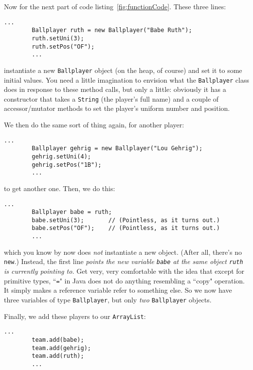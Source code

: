 Now for the next part of code listing~\ref{fig:functionCode}. These three
lines:

\begin{Verbatim}[fontsize=\small,samepage=true,frame=single]
        ...
        Ballplayer ruth = new Ballplayer("Babe Ruth");
        ruth.setUni(3);
        ruth.setPos("OF");
        ...
\end{Verbatim}

instantiate a new \texttt{Ballplayer} object (on the heap, of course) and set
it to some initial values. You need a little imagination to envision what the
\texttt{Ballplayer} class does in response to these method calls, but only a
little: obviously it has a constructor that takes a \texttt{String} (the
player's full name) and a couple of accessor/mutator methods to set the
player's uniform number and position. 

\pagebreak
We then do the same sort of thing again, for another player:

\begin{Verbatim}[fontsize=\small,samepage=true,frame=single]
        ...
        Ballplayer gehrig = new Ballplayer("Lou Gehrig");
        gehrig.setUni(4);
        gehrig.setPos("1B");
        ...
\end{Verbatim}

to get another one. Then, we do this:

\begin{Verbatim}[fontsize=\small,samepage=true,frame=single]
        ...
        Ballplayer babe = ruth;
        babe.setUni(3);       // (Pointless, as it turns out.)
        babe.setPos("OF");    // (Pointless, as it turns out.)
        ...
\end{Verbatim}

which you know by now does \textit{not} instantiate a new object. (After all,
there's no \texttt{new}.) Instead, the first line \textit{points the new
variable \texttt{babe} at the same object \texttt{ruth} is currently pointing
to.} Get very, very comfortable with the idea that except for primitive types,
``\texttt{=}" in Java does not do anything resembling a ``copy" operation. It
simply makes a reference variable refer to something else. So we now have
three variables of type \texttt{Ballplayer}, but only \textit{two}
\texttt{Ballplayer} objects.

Finally, we add these players to our \texttt{ArrayList}:

\begin{Verbatim}[fontsize=\small,samepage=true,frame=single]
        ...
        team.add(babe);
        team.add(gehrig);
        team.add(ruth);
        ...
\end{Verbatim}

